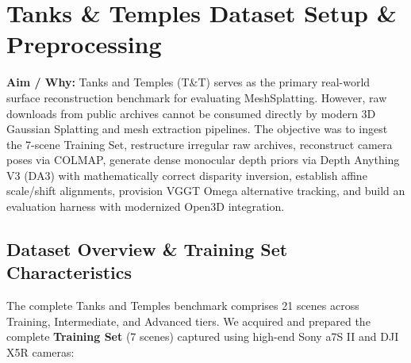 \section[\textcolor{\statusSecThree}{Tanks \& Temples Dataset Setup \& Preprocessing}]{\textcolor{\statusSecThree}{Tanks \& Temples Dataset Setup \& Preprocessing}}

\begin{tcolorbox}[title={Status: [Completed]}, colframe=\statusSecThree, colback=\statusSecThree!5]
\textbf{Aim / Why:} Tanks and Temples (T\&T) serves as the primary real-world surface reconstruction benchmark for evaluating MeshSplatting. However, raw downloads from public archives cannot be consumed directly by modern 3D Gaussian Splatting and mesh extraction pipelines. The objective was to ingest the 7-scene Training Set, restructure irregular raw archives, reconstruct camera poses via COLMAP, generate dense monocular depth priors via Depth Anything V3 (DA3) with mathematically correct disparity inversion, establish affine scale/shift alignments, provision VGGT Omega alternative tracking, and build an evaluation harness with modernized Open3D integration.
\end{tcolorbox}

\subsection{Dataset Overview \& Training Set Characteristics}
The complete Tanks and Temples benchmark comprises 21 scenes across Training, Intermediate, and Advanced tiers. We acquired and prepared the complete \textbf{Training Set} (7 scenes) captured using high-end Sony a7S II and DJI X5R cameras:

\begin{center}
\end{center}

